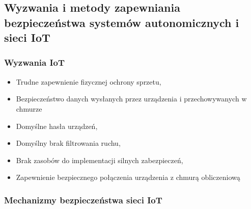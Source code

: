 \subsection{Wyzwania i metody zapewniania bezpieczeństwa systemów autonomicznych i sieci IoT}

\subsubsection{Wyzwania IoT}

\begin{itemize}
	\item Trudne zapewnienie fizycznej ochrony sprzetu,
	\item Bezpieczeństwo danych wysłanych przez urządzenia i przechowywanych w chmurze
	\item Domyślne hasła urządzeń,
	\item Domyślny brak filtrowania ruchu,
	\item Brak zasobów do implementacji silnych zabezpieczeń,
	\item Zapewnienie bezpiecznego połączenia urządzenia z chmurą obliczeniową
\end{itemize}

\subsubsection{Mechanizmy bezpieczeństwa sieci IoT}

